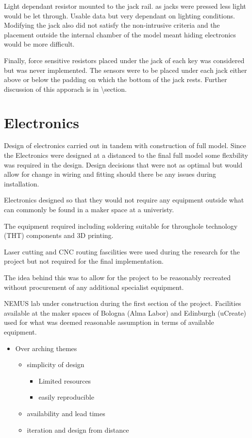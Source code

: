 Light dependant resistor mounted to the jack rail. as jacks were pressed
less light would be let through. Usable data but very dependant on
lighting conditions. Modifying the jack also did not satisfy the
non-intrusive criteria and the placement outside the internal chamber of
the model meant hiding electronics would be more difficult.

Finally, force sensitive resistors placed under the jack of each key was
considered but was never implemented. The sensors were to be placed
under each jack either above or below the padding on which the bottom of
the jack rests. Further discussion of this apporach is in
\textbackslash section.

\section{Electronics}\label{electronics}

Design of electronics carried out in tandem with construction of full
model. Since the Electronics were designed at a distanced to the final
full model some flexbility was required in the design. Design decisions
that were not as optimal but would allow for change in wiring and
fitting should there be any issues during installation.

Electronics designed so that they would not require any equipment
outside what can commonly be found in a maker space at a univeristy.

The equipment required including soldering suitable for throughole
technology (THT) components and 3D printing.

Laser cutting and CNC routing fascilities were used during the research
for the project but not required for the final implementation.

The idea behind this was to allow for the project to be reasonably
recreated without procurement of any additional specialist equipment.

NEMUS lab under construction during the first section of the project.
Facilities available at the maker spaces of Bologna (Alma Labor) and
Edinburgh (uCreate) used for what was deemed reasonable assumption in
terms of available equipment.

\begin{itemize}
\tightlist
\item
  Over arching themes

  \begin{itemize}
  \tightlist
  \item
    simplicity of design

    \begin{itemize}
    \tightlist
    \item
      Limited resources
    \item
      easily reproducible
    \end{itemize}
  \item
    availability and lead times
  \item
    iteration and design from distance
  \end{itemize}
\end{itemize}

